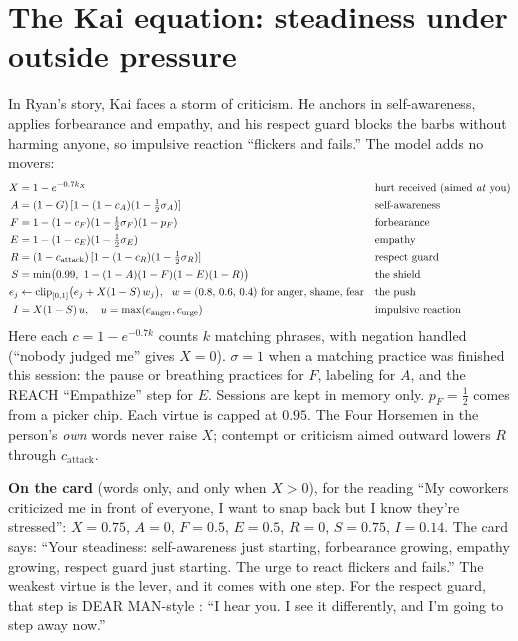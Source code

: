 \documentclass[10pt]{article}
\theoremstyle{remark}
\newcommand{\clip}{\operatorname{clip}_{[0,1]}}
\begin{document}
\section{The Kai equation: steadiness under outside pressure}\label{sec:kai}
In Ryan's story, Kai faces a storm of criticism. He anchors in self-awareness, applies forbearance and empathy, and his respect guard blocks the barbs without harming anyone, so impulsive reaction ``flickers and fails.'' The model adds no movers:
\begin{align*}
X &= 1-e^{-0.7k_X} && \text{hurt received (aimed \emph{at} you)}\\
A &= (1-G)\,[1-(1-c_A)(1-\tfrac12\sigma_A)] && \text{self-awareness}\\
F &= 1-(1-c_F)(1-\tfrac12\sigma_F)(1-p_F) && \text{forbearance}\\
E &= 1-(1-c_E)(1-\tfrac12\sigma_E) && \text{empathy}\\
R &= (1-c_{\text{attack}})\,[1-(1-c_R)(1-\tfrac12\sigma_R)] && \text{respect guard}\\
S &= \min\!\big(0.99,\ 1-(1-A)(1-F)(1-E)(1-R)\big) && \text{the shield}\\
e_j &\leftarrow \clip\!\big(e_j + X(1-S)\,w_j\big),\ \ w=(0.8,\,0.6,\,0.4)\text{ for anger, shame, fear} && \text{the push}\\
I &= X(1-S)\,u,\quad u=\max(e_{\text{anger}}, c_{\text{urge}}) && \text{impulsive reaction}
\end{align*}
Here each $c=1-e^{-0.7k}$ counts $k$ matching phrases, with negation handled (``nobody judged me'' gives $X=0$). $\sigma=1$ when a matching practice was finished this session: the pause or breathing practices for $F$, labeling for $A$, and the REACH ``Empathize'' step for $E$. Sessions are kept in memory only. $p_F=\tfrac12$ comes from a picker chip. Each virtue is capped at $0.95$. The Four Horsemen \citep{gottman1992} in the person's \emph{own} words never raise $X$; contempt or criticism aimed outward lowers $R$ through $c_{\text{attack}}$.

\textbf{On the card} (words only, and only when $X>0$), for the reading ``My coworkers criticized me in front of everyone, I want to snap back but I know they're stressed'': $X=0.75$, $A=0$, $F=0.5$, $E=0.5$, $R=0$, $S=0.75$, $I=0.14$. The card says: ``Your steadiness: self-awareness just starting, forbearance growing, empathy growing, respect guard just starting. The urge to react flickers and fails.'' The weakest virtue is the lever, and it comes with one step. For the respect guard, that step is DEAR MAN-style \citep{linehan2015}: ``I hear you. I see it differently, and I'm going to step away now.''
\end{document}
